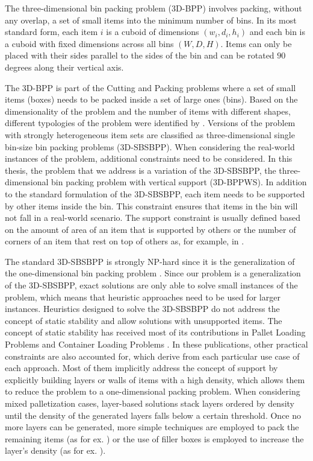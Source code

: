 The three-dimensional bin packing problem (3D-BPP) involves packing, without any overlap, a set of small items into the minimum number of bins.
In its most standard form, each item $i$ is a cuboid of dimensions $(w_i, d_i, h_i)$ and each bin is a cuboid with fixed dimensions across all bins $(W, D, H)$.
Items can only be placed with their sides parallel to the sides of the bin and can be rotated $90$ degrees along their vertical axis.

The 3D-BPP is part of the Cutting and Packing problems where a set of small items (boxes) needs to be packed inside a set of large ones (bins).
Based on the dimensionality of the problem and the number of items with different shapes, different typologies of the problem were identified by \citep{WASCHER20071109}.
Versions of the problem with strongly heterogeneous item sets are classified as three-dimensional single bin-size bin packing problems (3D-SBSBPP). %
When considering the real-world instances of the problem, additional constraints need to be considered.
In this thesis, the problem that we address is a variation of the 3D-SBSBPP, the three-dimensional bin packing problem with vertical support (3D-BPPWS).
In addition to the standard formulation of the 3D-SBSBPP, each item needs to be supported by other items inside the bin.
This constraint ensures that items in the bin will not fall in a real-world scenario.
The support constraint is usually defined based on the amount of area of an item that is supported by others or the number of corners of an item that rest on top of others as, for example, in \citep{GZARA20201062, paquay2016mixed, kurpel2020exact}.

The standard 3D-SBSBPP is strongly NP-hard since it is the generalization of the one-dimensional bin packing problem \citep{martello2000three}.
Since our problem is a generalization of the 3D-SBSBPP, exact solutions are only able to solve small instances of the problem, which means that heuristic approaches need to be used for larger instances.
Heuristics designed to solve the 3D-SBSBPP do not address the concept of static stability and allow solutions with unsupported items.
The concept of static stability has received most of its contributions in Pallet Loading Problems and Container Loading Problems \citep{Calzavara2021, kurpel2020exact}.
In these publications, other practical constraints are also accounted for, which derive from each particular use case of each approach.
Most of them implicitly address the concept of support by explicitly building layers or walls of items with a high density, which allows them to reduce the problem to a one-dimensional packing problem.
When considering mixed palletization cases, layer-based solutions stack layers ordered by density until the density of the generated layers falls below a certain threshold.
Once no more layers can be generated, more simple techniques are employed to pack the remaining items (as for ex. \citep{elhedhli2019three}) or the use of filler boxes is employed to increase the layer's density (as for ex. \citep{Calzavara2021}).

